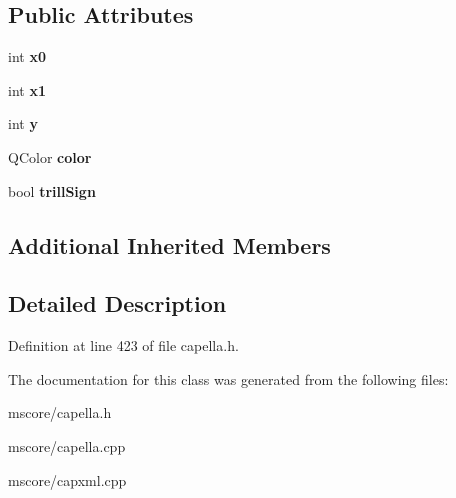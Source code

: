 \subsection*{Public Attributes}
\begin{DoxyCompactItemize}
\item 
\mbox{\label{class_ms_1_1_trill_obj_acd6027c3cf6b9cb844bf4c8ce18062bd}} 
int {\bfseries x0}
\item 
\mbox{\label{class_ms_1_1_trill_obj_aaa2731add4be65ab7422c999b14241a7}} 
int {\bfseries x1}
\item 
\mbox{\label{class_ms_1_1_trill_obj_a6cee2891e4f8448f9a2f005d6116ec75}} 
int {\bfseries y}
\item 
\mbox{\label{class_ms_1_1_trill_obj_a1e0ab125b66eb2291ee7f320e375b905}} 
Q\+Color {\bfseries color}
\item 
\mbox{\label{class_ms_1_1_trill_obj_ac61e58727cfebf2f97e4926a30d98e84}} 
bool {\bfseries trill\+Sign}
\end{DoxyCompactItemize}
\subsection*{Additional Inherited Members}


\subsection{Detailed Description}


Definition at line 423 of file capella.\+h.



The documentation for this class was generated from the following files\+:\begin{DoxyCompactItemize}
\item 
mscore/capella.\+h\item 
mscore/capella.\+cpp\item 
mscore/capxml.\+cpp\end{DoxyCompactItemize}
